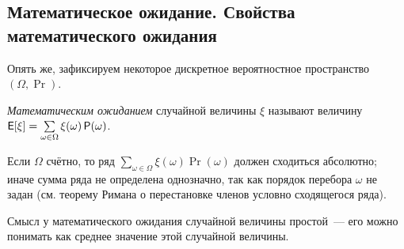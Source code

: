 \subsection{Математическое ожидание. Свойства математического ожидания}
Опять же, зафиксируем некоторое дискретное вероятностное пространство \((\Omega, \Pr)\).
\begin{definition}
    \emph{Математическим ожиданием} случайной величины \(\xi\) называют величину \(\E[\xi] = \sum\limits_{\omega \in \Omega} \xi(\omega)\Pr(\omega)\).
\end{definition}
\begin{remark}
    Если \(\Omega\) счётно, то ряд \(\sum\limits_{\omega \in \Omega} \xi(\omega)\Pr(\omega)\) должен сходиться абсолютно; иначе сумма ряда не определена однозначно, так как порядок перебора \(\omega\) не задан (см. теорему Римана о перестановке членов условно сходящегося ряда).
\end{remark}
Смысл у математического ожидания случайной величины простой~--- его можно понимать как среднее значение этой случайной величины.


